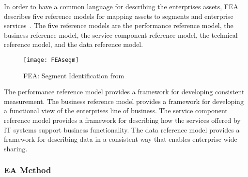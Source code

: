 %
%

In order to have a common language for describing the enterprises assets, FEA describes five reference models for mapping assets to segments and enterprise services~\cite{FEA_PMO2007}. The five reference models are the performance reference model, the business reference model, the service component reference model, the technical reference model, and the data reference model. 
\begin{figure}
\centering
\texttt{[image: FEAsegm]}
\caption{FEA: Segment Identification from ~\cite{FEA_PMO2007}}
\label{fig:FEA_segmentID}
\end{figure}

The performance reference model provides a framework for developing consistent measurement. The business reference model provides a framework for developing a functional view of the enterprises line of business. The service component reference model provides a framework for describing how the services offered by IT systems support business functionality.  The data reference model provides a framework for describing data in a consistent way that enables enterprise-wide sharing. 

\subsubsection{EA Method}


%
%

